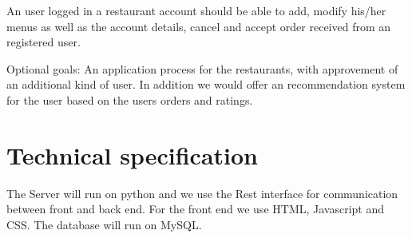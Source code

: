 \documentclass[parskip=half, a4paper]{scrartcl}
\begin{document}
An user logged in a restaurant account should be able to add, modify 
his/her menus as well as the account details, cancel and accept order
received from an registered user.

Optional goals: An application process for the restaurants, with 
approvement of an additional kind of user. In addition we would offer
an recommendation system for the user based on the users orders and 
ratings.

\section{Technical specification}
The Server will run on python and we use the Rest interface for communication
between front and back end. For the front end we use HTML, Javascript and CSS.
The database will run on MySQL.
\end{document}
